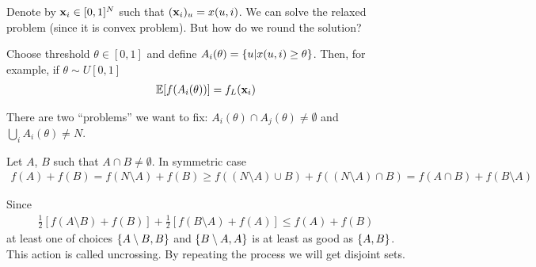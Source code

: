 Denote by $\vb{x}_i \in [0,1]^N$ such that $(\vb{x}_i)_u = x(u,i)$. We can solve the relaxed problem (since it is convex problem). But how do we round the solution?

Choose threshold $\theta \in [0,1]$ and define $A_i(\theta) = \qty{u| x(u,i) \geq \theta}$. Then, for example, if $\theta \sim U[0,1]$
\begin{align}
\mathbb{E} [f(A_i(\theta))] = f_L(\vb{x}_i)
\end{align}

There are two ``problems'' we want to fix: $A_i(\theta) \cap A_j(\theta) \neq \emptyset $ and $\bigcup_i A_i(\theta) \neq N$.

Let $A$, $B$ such that $A\cap B \neq \emptyset $. In symmetric case
\begin{align}
f(A)+f(B) = f(N\setminus A) + f(B) \geq f((N\setminus A) \cup B) + f((N\setminus A) \cap B) = f(A\cap B) + f(B\setminus A)
\end{align}

Since
\begin{align}
\frac{1}{2}[f(A\setminus B) + f(B)] + \frac{1}{2}[f(B\setminus A) + f(A)] \leq f(A) + f(B)
\end{align}
at least one of choices $\qty{A\setminus B, B}$ and $\qty{B\setminus A, A}$ is at least as good as $\qty{A,B}$. This action is called uncrossing. By repeating the process we will get disjoint sets.

